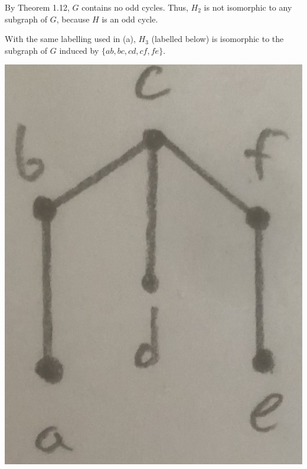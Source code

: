 \documentclass[12pt]{article}
\begin{document}

By Theorem 1.12, $G$ contains no odd cycles.
Thus, $H_2$ is not isomorphic to any subgraph of $G$, because $H$ is an odd cycle.


With the same labelling used in (a), $H_3$ (labelled below) is isomorphic to the subgraph of $G$ induced by $\{ab, bc, cd, cf, fe\}$.
\begin{center}
\includegraphics[scale=.05]{317H3.jpg}
\end{center}
\end{document}
